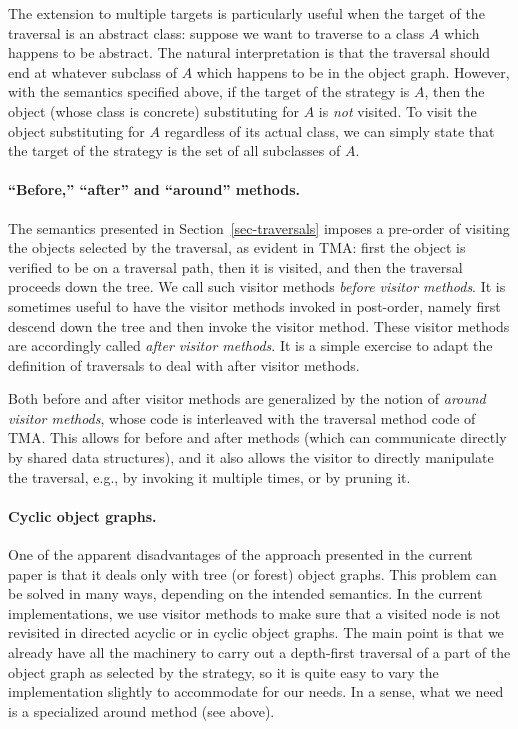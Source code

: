 The extension to multiple targets is particularly useful when the
target of the traversal is an abstract class: suppose we want to
traverse to a class $A$ which happens to be abstract. The natural
interpretation is that the traversal should end at whatever subclass
of $A$ which happens to be in the object graph. However, with the
semantics specified above, if the target of the strategy is $A$, then
the object (whose class is concrete) substituting for $A$ is {\em not}
visited.  To visit the object substituting for $A$ regardless of its
actual class, we can simply state that the target of the strategy is
the set of all subclasses of $A$.

\paragraph{``Before,'' ``after'' and ``around'' methods.}
The semantics presented in Section~\ref{sec-traversals} imposes a
pre-order of visiting the objects selected by the traversal, as
evident in TMA: first the object is verified to be on a traversal
path, then it is visited, and then the traversal proceeds down the
tree. We call such visitor methods {\em before visitor methods}.  It
is sometimes useful to have the visitor methods invoked in post-order,
namely first descend down the tree and then invoke the visitor
method. These visitor methods are accordingly called {\em after
visitor methods}. It is a simple exercise to adapt the definition of
traversals to deal with after visitor methods.

Both before and after visitor methods are generalized by the notion of
{\em around visitor methods}, whose code is interleaved with the
traversal method code of TMA.  This allows for before and after
methods (which can communicate directly by shared data structures),
and it also allows the visitor to directly manipulate the traversal,
e.g., by invoking it multiple times, or by pruning it.
 
\paragraph{Cyclic object graphs.}  One of the apparent disadvantages
of the approach presented in the current paper is that it deals only
with tree (or forest) object graphs.  This problem can be solved in
many ways, depending on the intended semantics. In the current
implementations, we use visitor methods to make sure that a visited
node is not revisited in directed acyclic or in cyclic object graphs.
The main point is that we already have all the machinery to carry out
a depth-first traversal of a part of the object graph as selected by
the strategy, so it is quite easy to vary the implementation slightly
to accommodate for our needs. In a sense, what we need is a
specialized around method (see above).

